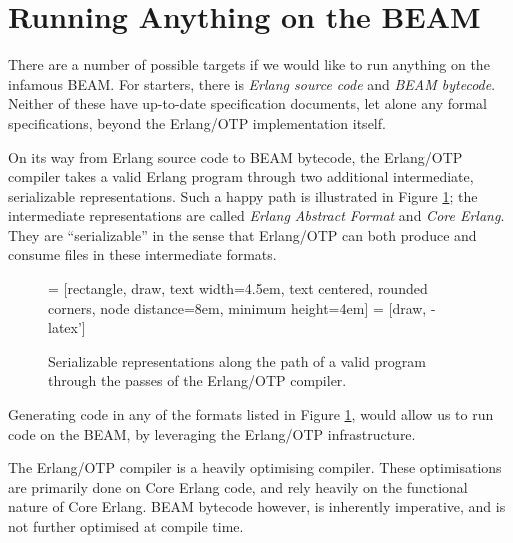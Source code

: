 \section{Running Anything on the BEAM}

There are a number of possible targets if we would like to run
anything on the infamous BEAM. For starters, there is \emph{Erlang
source code} and \emph{BEAM bytecode}. Neither of these have
up-to-date specification documents\footnotemark, let alone any formal
specifications, beyond the Erlang/OTP implementation itself.


On its way from Erlang source code to BEAM bytecode, the Erlang/OTP
compiler takes a valid Erlang program through two additional
intermediate, serializable representations. Such a happy path is
illustrated in Figure \ref{fig:serializable-representations}; the
intermediate representations are called \emph{Erlang Abstract Format}
and \emph{Core Erlang}.  They are ``serializable'' in the sense that
Erlang/OTP can both produce and consume files in these intermediate
formats.
 
\begin{figure}[h]
\centering
{} = [rectangle, draw, 
    text width=4.5em, text centered, rounded corners,
    node distance=8em,
    minimum height=4em]
 = [draw, -latex']


\caption{Serializable representations along the path of a valid
program through the passes of the Erlang/OTP compiler.}

\label{fig:serializable-representations}
\end{figure}

Generating code in any of the formats listed in Figure
\ref{fig:serializable-representations}, would allow us to run code on
the BEAM, by leveraging the Erlang/OTP infrastructure.

The Erlang/OTP compiler is a heavily optimising compiler. These
optimisations are primarily done on Core Erlang code, and rely heavily
on the functional nature of Core Erlang. BEAM bytecode however, is
inherently imperative, and is not further optimised at compile time.



